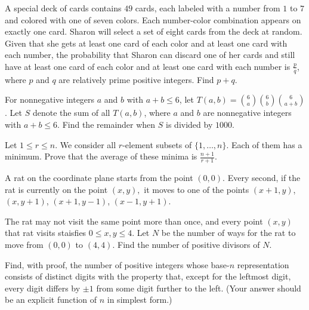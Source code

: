 \documentclass{article}
\begin{document}
    \begin{prob}[AIME II 2017/9]{4}
A special deck of cards contains $49$ cards, each labeled with a number from $1$ to $7$ and colored with one of seven colors. Each number-color combination appears on exactly one card. Sharon will select a set of eight cards from the deck at random. Given that she gets at least one card of each color and at least one card with each number, the probability that Sharon can discard one of her cards and still have at least one card of each color and at least one card with each number is $\frac{p}{q}$, where $p$ and $q$ are relatively prime positive integers. Find $p+q$.
\end{prob}
    
    \begin{prob}[AIME I 2017/7]{6}
For nonnegative integers $a$ and $b$ with $a + b \leq 6$, let $T(a, b) = \binom{6}{a} \binom{6}{b} \binom{6}{a + b}$. Let $S$ denote the sum of all $T(a, b)$, where $a$ and $b$ are nonnegative integers with $a + b \leq 6$. Find the remainder when $S$ is divided by $1000$.
\end{prob}
    
    \begin{req}[AIME 1992/12]{6}
}

\vspace{0.2cm
\end{req}

\begin{prob}[IMO 1981/2]{6}
Let $1\leq r\leq n.$ We consider all $r$-element subsets of $\{1,\ldots,n\}.$ Each of them has a minimum. Prove that the average of these minima is $\frac{n+1}{r+1}.$
\end{prob}

\begin{prob}[CIME II 2021/6]{6}
A rat on the coordinate plane starts from the point $(0,0).$ Every second, if the rat is currently on the point $(x,y),$ it moves to one of the points $(x+1,y)$, $(x,y+1)$, $(x+1,y-1)$, $(x-1,y+1).$

\noindent The rat may not visit the same point more than once, and every point $(x,y)$ that rat visits staisfies $0\leq x, y\leq 4.$ Let $N$ be the number of ways for the rat to move from $(0,0)$ to $(4,4).$ Find the number of positive divisors of $N.$
\end{prob}

\begin{prob}[USAMO 1990/4]{9}
Find, with proof, the number of positive integers whose base-$n$ representation consists of distinct digits with the property that, except for the leftmost digit, every digit differs by $\pm 1$ from some digit further to the left. (Your answer should be an explicit function of $n$ in simplest form.)
\end{prob}
\end{document}
